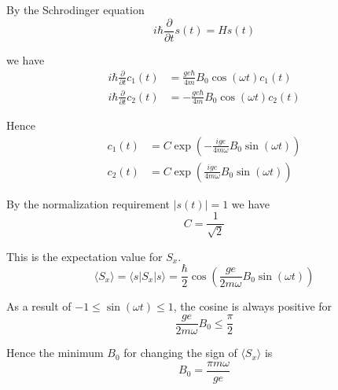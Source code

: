 By the Schrodinger equation
\begin{equation*}
i\hbar\frac{\partial}{\partial t}s(t)=Hs(t)
\end{equation*}

we have
\begin{align*}
i\hbar\frac{\partial}{\partial t}c_1(t)&=\frac{ge\hbar}{4m}B_0\cos(\omega t)c_1(t)
\\
i\hbar\frac{\partial}{\partial t}c_2(t)&=-\frac{ge\hbar}{4m}B_0\cos(\omega t)c_2(t)
\end{align*}

Hence
\begin{equation*}
\begin{aligned}
c_1(t)&=C\exp\left(-\frac{ige}{4m\omega}B_0\sin(\omega t)\right)
\\
c_2(t)&=C\exp\left(\frac{ige}{4m\omega}B_0\sin(\omega t)\right)
\end{aligned}
\tag{1}
\end{equation*}

By the normalization requirement $|s(t)|=1$ we have
\begin{equation*}
C=\frac{1}{\sqrt2}
\end{equation*}

This is the expectation value for $S_x$.
\begin{equation*}
\langle S_x\rangle=\langle s|S_x|s\rangle
=\frac{\hbar}{2}\cos\left(\frac{ge}{2m\omega}B_0\sin(\omega t)\right)
\tag{2}
\end{equation*}

As a result of $-1\le\sin(\omega t)\le1$, the cosine is always positive for
\begin{equation*}
\frac{ge}{2m\omega}B_0\le\frac{\pi}{2}
\end{equation*}

Hence the minimum $B_0$ for changing the sign of $\langle S_x\rangle$ is
\begin{equation*}
B_0=\frac{\pi m\omega}{ge}
\end{equation*}



